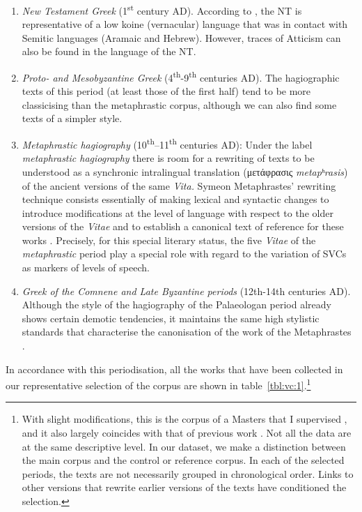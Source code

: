 \documentclass[output=paper,colorlinks,citecolor=brown]{langscibook}
\begin{document}
\begin{enumerate}
\def\labelenumi{(\roman{enumi})}
\item \emph{New Testament Greek} (1\textsuperscript{st} century AD). According to
  \citet[61]{RicoChristopher-201078}, the NT is representative of a low koine (vernacular)
  language that was in contact with Semitic languages (Aramaic and Hebrew). However,
  traces of Atticism can also be found in the language of the NT.
\item
  \emph{Proto- and Mesobyzantine Greek}
  (4\textsuperscript{th}-9\textsuperscript{th} centuries AD). The
  hagiographic texts of this period (at least those of the first half)
  tend to be more classicising than the metaphrastic corpus, although we
  can also find some texts of a simpler style.
\item \emph{Metaphrastic hagiography} (10\textsuperscript{th}--11\textsuperscript{th}
  centuries AD): Under the label \emph{metaphrastic hagiography} there is room for a
  rewriting of texts to be understood as a synchronic intralingual translation (μετάφρασις
  \emph{metapʰrasis}) of the ancient versions of the same \emph{Vita.}
  Symeon Metaphrastes' rewriting technique consists essentially of making lexical and
  syntactic changes to introduce modifications at the level of language with respect to
  the older versions of the \emph{Vitae} and to establish a canonical text of reference
  for these works \parencites{HogelChristian-2002181,HøgelChristian-2021320}. Precisely,
  for this special literary status, the five \emph{Vitae} of the
  \emph{metaphrastic} period play a special role with regard to the variation of SVCs as markers
  of levels of speech.
\item \emph{Greek of the Comnene and Late Byzantine periods} (12th-14th centuries AD).
  Although the style of the hagiography of the Palaeologan period already shows certain
  demotic tendencies, it maintains the same high stylistic standards that characterise the
  canonisation of the work of the Metaphrastes
  \parencites{HinterbergerMartin-2014130,HinterbergerMartin-202164}.
\end{enumerate}


In accordance with this periodisation, all the works that have been collected in our
representative selection of the corpus are shown in table~\ref{tbl:vc:1}.\footnote{With
  slight modifications, this is the corpus of a Masters that I supervised
  \parencite{MadrigalAceroLucía-2022164}, and it also largely coincides with that of
  previous work \parencite[318--321]{VivesCuestaAlfonsoandMadrigalAceroLucía-2022404}. Not
  all the data are at the same descriptive level. In our dataset, we make a distinction
  between the main corpus and the control or reference corpus. In each of the selected
  periods, the texts are not necessarily grouped in chronological order. Links to other
  versions that rewrite earlier versions of the texts have conditioned the selection.}
\end{document}
